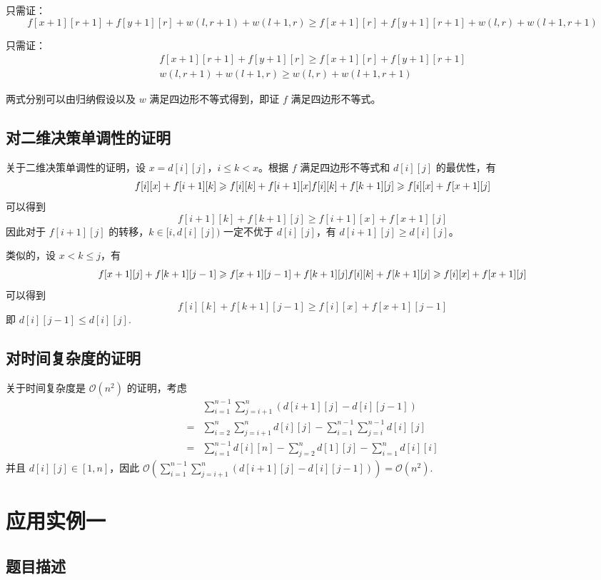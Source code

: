 只需证： \[f[x+1][r+1]+f[y+1][r]+w(l,r+1)+w(l+1,r)\ge f[x+1][r]+f[y+1][r+1]+w(l,r)+w(l+1,r+1)
\]

只需证： \[
\begin{array}{c}
f[x+1][r+1]+f[y+1][r]\ge f[x+1][r]+f[y+1][r+1]\\
w(l,r+1)+w(l+1,r)\ge w(l,r)+w(l+1,r+1)
\end{array}
\]

两式分别可以由归纳假设以及 \(w\) 满足四边形不等式得到，即证 \(f\)
满足四边形不等式。

\subsection{对二维决策单调性的证明}

关于二维决策单调性的证明，设 \(x=d[i][j]\)，\(i\le k < x\)。根据 \(f\)
满足四边形不等式和 \(d[i][j]\) 的最优性，有 \[
f[i][x]+f[i+1][k]\ge f[i][k]+f[i+1][x]\\
f[i][k]+f[k+1][j]\ge f[i][x]+f[x+1][j]
\] 可以得到 \[
f[i+1][k]+f[k+1][j]\ge f[i+1][x]+f[x+1][j]
\] 因此对于 \(f[i+1][j]\) 的转移，\(k\in [i,d[i][j])\) 一定不优于
\(d[i][j]\)，有 \(d[i+1][j]\ge d[i][j]\)。

类似的，设 \(x < k\le j\)，有 \[
f[x+1][j]+f[k+1][j-1]\ge f[x+1][j-1]+f[k+1][j]\\
f[i][k]+f[k+1][j]\ge f[i][x]+f[x+1][j]
\] 可以得到 \[
f[i][k]+f[k+1][j-1]\ge f[i][x]+f[x+1][j-1]
\] 即 \(d[i][j-1]\le d[i][j]\).

\subsection{对时间复杂度的证明}

关于时间复杂度是 \(\mathcal{O}(n^2)\) 的证明，考虑 \[
\begin{aligned}
&\sum_{i=1}^{n-1}\sum_{j=i+1}^n(d[i+1][j]-d[i][j-1])\\
=&\sum_{i=2}^n\sum_{j=i+1}^nd[i][j]-\sum_{i=1}^{n-1}\sum_{j=i}^{n-1}d[i][j]\\
=&\sum_{i=1}^{n-1}d[i][n]-\sum_{j=2}^nd[1][j]-\sum_{i=1}^nd[i][i]
\end{aligned}
\]
并且 \(d[i][j]\in[1,n]\)，因此
\(\mathcal{O}(\sum_{i=1}^{n-1}\sum_{j=i+1}^n(d[i+1][j]-d[i][j-1]))=\mathcal{O}(n^2)\).

\section{应用实例一}

\subsection{题目描述}

